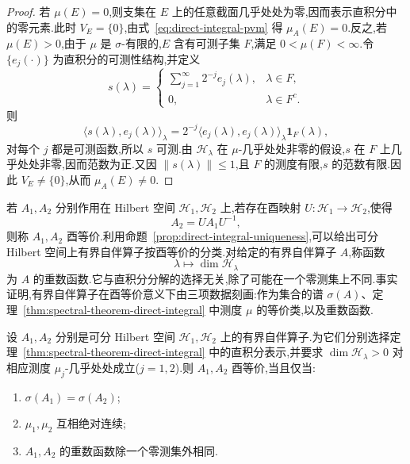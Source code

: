{\begin{proof}
若 \(\mu(E)=0\),则支集在 \(E\) 上的任意截面几乎处处为零,因而表示直积分中的零元素.此时 \(V_{E}=\{0\}\),由式~\eqref{eq:direct-integral-pvm} 得 \(\mu_{A}(E)=0\).反之,若 \(\mu(E)>0\),由于 \(\mu\) 是 \(\sigma\)-有限的,\(E\) 含有可测子集 \(F\),满足 \(0<\mu(F)<\infty\).令 \(\{e_{j}(\cdot)\}\) 为直积分的可测性结构,并定义
\[
s(\lambda)=
\begin{cases}
\displaystyle\sum_{j=1}^{\infty}2^{-j}e_{j}(\lambda),&\lambda\in F,\\
0,&\lambda\in F^{c}.
\end{cases}
\]
则
\[
\langle s(\lambda),e_{j}(\lambda)\rangle_{\lambda}
=2^{-j}\langle e_{j}(\lambda),e_{j}(\lambda)\rangle_{\lambda}\mathbf{1}_{F}(\lambda),
\]
对每个 \(j\) 都是可测函数,所以 \(s\) 可测.由 \(\mathcal{H}_{\lambda}\) 在 \(\mu\)-几乎处处非零的假设,\(s\) 在 \(F\) 上几乎处处非零,因而范数为正.又因 \(\|s(\lambda)\|\leq1\),且 \(F\) 的测度有限,\(s\) 的范数有限.因此 \(V_{E}\neq\{0\}\),从而 \(\mu_{A}(E)\neq0\).
\end{proof}

若 \(A_{1},A_{2}\) 分别作用在 Hilbert 空间 \(\mathcal{H}_{1},\mathcal{H}_{2}\) 上,若存在酉映射 \(U:\mathcal{H}_{1}\to\mathcal{H}_{2}\),使得
\[
A_{2}=UA_{1}U^{-1},
\]
则称 \(A_{1},A_{2}\) 酉等价.利用命题~\ref{prop:direct-integral-uniqueness},可以给出可分 Hilbert 空间上有界自伴算子按酉等价的分类.对给定的有界自伴算子 \(A\),称函数
\[
\lambda\longmapsto\dim\mathcal{H}_{\lambda}
\]
为 \(A\) 的重数函数.它与直积分分解的选择无关,除了可能在一个零测集上不同.事实证明,有界自伴算子在酉等价意义下由三项数据刻画:作为集合的谱 \(\sigma(A)\)、定理~\ref{thm:spectral-theorem-direct-integral} 中测度 \(\mu\) 的等价类,以及重数函数.

\begin{proposition}[有界自伴算子的分类]\label{prop:bounded-spectral-classification}
设 \(A_{1},A_{2}\) 分别是可分 Hilbert 空间 \(\mathcal{H}_{1},\mathcal{H}_{2}\) 上的有界自伴算子.为它们分别选择定理~\ref{thm:spectral-theorem-direct-integral} 中的直积分表示,并要求 \(\dim\mathcal{H}_{\lambda}>0\) 对相应测度 \(\mu_{j}\)-几乎处处成立(\(j=1,2\)).则 \(A_{1},A_{2}\) 酉等价,当且仅当:
\begin{enumerate}
\item \(\sigma(A_{1})=\sigma(A_{2})\);
\item \(\mu_{1},\mu_{2}\) 互相绝对连续;
\item \(A_{1},A_{2}\) 的重数函数除一个零测集外相同.
\end{enumerate}
\end{proposition}

}
